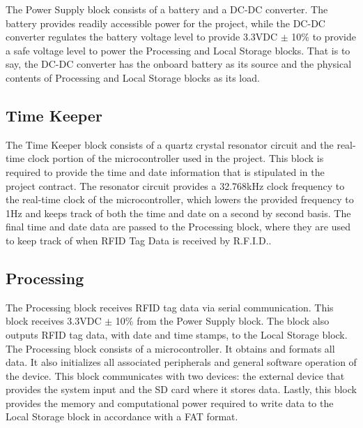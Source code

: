 The Power Supply block consists of a battery and a DC-DC converter. The battery provides readily accessible power for the project, while the DC-DC converter regulates the battery voltage level to provide 3.3VDC $\pm$ 10\% to provide a safe voltage level to power the Processing and Local Storage blocks. That is to say, the DC-DC converter has the onboard battery as its source and the physical contents of Processing and Local Storage blocks as its load.

\subsection{Time Keeper}
The Time Keeper block consists of a quartz crystal resonator circuit and the real-time clock portion of the microcontroller used in the project. This block is required to provide the time and date information that is stipulated in the project contract. The resonator circuit provides a 32.768kHz clock frequency to the real-time clock of the microcontroller, which lowers the provided frequency to 1Hz and keeps track of both the time and date on a second by second basis. The final time and date data are passed to the Processing block, where they are used to keep track of when RFID Tag Data is received by R.F.I.D..


\subsection{Processing}
 The Processing block receives RFID tag data via serial communication. This block receives 3.3VDC $\pm$ 10\% from the Power Supply block. The block also outputs RFID tag data, with date and time stamps, to the Local Storage block. The Processing block consists of a microcontroller. It obtains and formats all data. It also initializes all associated peripherals and general software operation of the device. This block communicates with two devices: the external device that provides the system input and the SD card where it stores data. Lastly, this block provides the memory and computational power required to write data to the Local Storage block in accordance with a FAT format.
 
 


